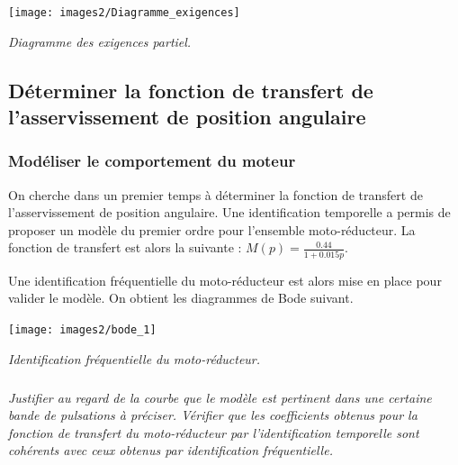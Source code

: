 \documentclass[10pt,fleqn]{article} %
\begin{document}
\begin{center}%
\centering

\texttt{[image: images2/Diagramme\_exigences]}

\textit{Diagramme des exigences partiel.}
\end{center}

\subsection{Déterminer la fonction de transfert de l'asservissement de position angulaire}


\subsubsection*{Modéliser le comportement du moteur\\}
		
On cherche dans un premier temps à déterminer la fonction de transfert de l'asservissement de position angulaire. Une identification temporelle a permis de proposer un modèle du premier ordre pour l'ensemble moto-réducteur.  La fonction de transfert est alors la suivante : $M(p)=\frac{\num{0.44}}{1+\num{0.015} p}$.


Une identification fréquentielle du moto-réducteur est alors mise en place pour valider le modèle. On obtient les diagrammes de Bode suivant.

\begin{center}
\texttt{[image: images2/bode\_1]}

\textit{Identification fréquentielle du moto-réducteur.}
\end{center}

\subparagraph{}\textit{\label{p02_robot_endo:qdr2} Justifier au regard de la courbe que le modèle est pertinent dans une certaine bande de pulsations à préciser. Vérifier que les coefficients obtenus pour la fonction de transfert du moto-réducteur par l'identification temporelle sont cohérents avec ceux obtenus par identification fréquentielle.}

\end{document}
